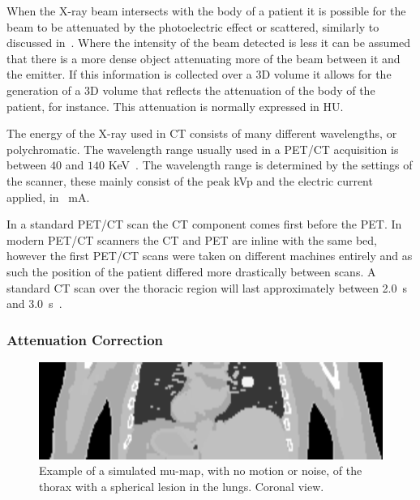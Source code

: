             When the X-ray beam intersects with the body of a patient it is possible for the beam to be attenuated by the photoelectric effect or scattered,%
            similarly to discussed in~. Where the intensity of the beam detected is less it can be assumed that there is a more dense object attenuating more of the beam between it and the emitter. If this information is collected over a \gls{3D} volume it allows for the generation of a \gls{3D} volume that reflects the attenuation of the body of the patient, for instance. This attenuation is normally expressed in \gls{HU}.
            
            The energy of the X-ray used in \gls{CT} consists of many different wavelengths, or polychromatic. The wavelength range usually used in a \gls{PET}/\gls{CT} acquisition is between $40$ and $140$ \gls{KeV}~. The wavelength range is determined by the settings of the scanner, these mainly consist of the peak \gls{kVp} and the electric current applied, in \SI{}{\milli\ampere}.
            
            In a standard \gls{PET}/\gls{CT} scan the \gls{CT} component comes first before the \gls{PET}. In modern \gls{PET}/\gls{CT} scanners the \gls{CT} and \gls{PET} are inline with the same bed, however the first \gls{PET}/\gls{CT} scans were taken on different machines entirely and as such the position of the patient differed more drastically between scans. A standard \gls{CT} scan over the thoracic region will last approximately between \SI{2.0}{\second} and \SI{3.0}{\second}~.
        
            \subsubsection{Attenuation Correction} \label{sec:attenuation_correction}
                \begin{figure}
                    \centering
                    
                    \includegraphics[width=1.0\linewidth]{figures/background_mu_map_example.png}
                    
                    \captionsetup{singlelinecheck=false, justification=raggedright}
                    \caption{Example of a simulated \gls{mu-map}, with no motion or noise, of the thorax with a spherical lesion in the lungs. Coronal view.} \label{fig:combined_pet_ct_mu_map_example}
                \end{figure}
                
